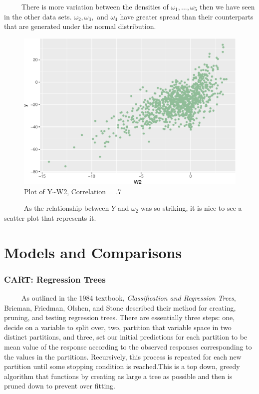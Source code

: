 \documentclass[12pt,twoside]{reedthesis}
\begin{document}
  ~~~~~There is more variation between the densities of
  \(\omega_1,...,\omega_5\) then we have seen in the other data sets.
  \(\omega_2,\omega_3,\) and \(\omega_4\) have greater spread than their
  counterparts that are generated under the normal distribution.
  
  \begin{figure}[htbp]
  \centering
  \includegraphics{Thesis_files/figure-latex/yw2-1.pdf}
  \caption{\label{fig:yw2}Plot of Y\textasciitilde{}W2, Correlation = .7}
  \end{figure}
  
  ~~~~~ As the relationship between \(Y\) and \(\omega_2\) was so
  striking, it is nice to see a scatter plot that represents it.
  
  \section{Models and Comparisons}\label{models-and-comparisons}
  
  \subsubsection{CART: Regression Trees}\label{cart-regression-trees}
  
  ~~~~~As outlined in the 1984 textbook, \emph{Classification and
  Regression Trees}, Brieman, Friedman, Olshen, and Stone described their
  method for creating, pruning, and testing regression trees. There are
  essentially three steps: one, decide on a variable to split over, two,
  partition that variable space in two distinct partitions, and three, set
  our initial predictions for each partition to be mean value of the
  response according to the observed responses corresponding to the values
  in the partitions. Recursively, this process is repeated for each new
  partition until some stopping condition is reached.This is a top down,
  greedy algorithm that functions by creating as large a tree as possible
  and then is pruned down to prevent over fitting.
  
\end{document}
